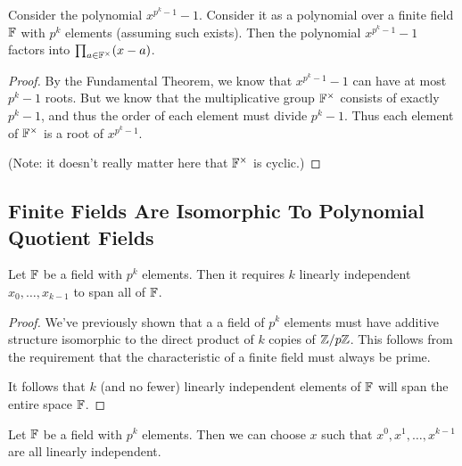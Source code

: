 \begin{proposition}
  Consider the polynomial $x^{p^k - 1} - 1$. Consider it as a polynomial
  over a finite field $\mathbb{F}$ with $p^k$ elements (assuming such exists).
  Then the polynomial $x^{p^k - 1} - 1$ factors into $\prod_{a\in
  \mathbb{F}^\times} \mathopen{}\left( {x - a} \right)\mathclose{}$.
\end{proposition}

\begin{proof}
  By the Fundamental Theorem, we know that $x^{p^k - 1} - 1$ can have at
  most $p^k - 1$ roots. But we know that the multiplicative group
  $\mathbb{F}^\times$ consists of exactly $p^k - 1$, and thus the order of each
  element must divide $p^k - 1$. Thus each element of $\mathbb{F}^\times$ is a
  root of $x^{p^k - 1}$.

  (Note: it doesn't really matter here that $\mathbb{F}^\times$ is cyclic.)
\end{proof}

\subsection{Finite Fields Are Isomorphic To Polynomial Quotient Fields}

\begin{lemma}
  Let $\mathbb{F}$ be a field with $p^k$ elements. Then it requires $k$ linearly
  independent $x_0, \ldots, x_{k-1}$ to span all of $\mathbb{F}$.
\end{lemma}

\begin{proof}
  We've previously shown that a a field of $p^k$ elements must have
  additive structure isomorphic to the direct product of $k$ copies of
  $\mathbb{Z} / p\mathbb{Z}$. This follows from the requirement that the characteristic of
  a finite field must always be prime.

  It follows that $k$ (and no fewer) linearly independent elements of
  $\mathbb{F}$ will span the entire space $\mathbb{F}$.
\end{proof}

\begin{lemma}
  Let $\mathbb{F}$ be a field with $p^k$ elements. Then we can choose $x$ such
  that $x^0, x^1, \ldots, x^{k-1}$ are all linearly independent.
\end{lemma}

